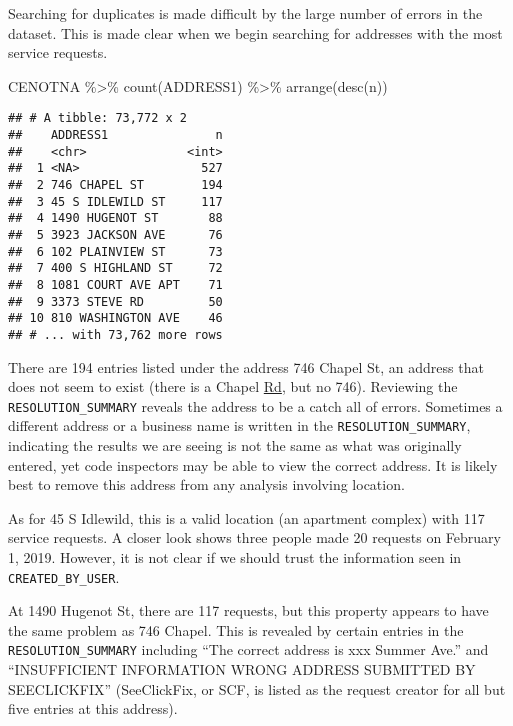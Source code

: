 \documentclass[
]{book}
\newenvironment{Shaded}{\begin{snugshade}}{\end{snugshade}}
\newcommand{\FunctionTok}[1]{\textcolor[rgb]{0.00,0.00,0.00}{#1}}
\newcommand{\NormalTok}[1]{#1}
\newcommand{\SpecialCharTok}[1]{\textcolor[rgb]{0.00,0.00,0.00}{#1}}
\begin{document}
Searching for duplicates is made difficult by the large number of errors in the dataset. This is made clear when we begin searching for addresses with the most service requests.

\begin{Shaded}
\begin{Highlighting}[]
\NormalTok{CENOTNA }\SpecialCharTok{\%\textgreater{}\%} \FunctionTok{count}\NormalTok{(ADDRESS1) }\SpecialCharTok{\%\textgreater{}\%} \FunctionTok{arrange}\NormalTok{(}\FunctionTok{desc}\NormalTok{(n))}
\end{Highlighting}
\end{Shaded}

\begin{verbatim}
## # A tibble: 73,772 x 2
##    ADDRESS1               n
##    <chr>              <int>
##  1 <NA>                 527
##  2 746 CHAPEL ST        194
##  3 45 S IDLEWILD ST     117
##  4 1490 HUGENOT ST       88
##  5 3923 JACKSON AVE      76
##  6 102 PLAINVIEW ST      73
##  7 400 S HIGHLAND ST     72
##  8 1081 COURT AVE APT    71
##  9 3373 STEVE RD         50
## 10 810 WASHINGTON AVE    46
## # ... with 73,762 more rows
\end{verbatim}

There are 194 entries listed under the address 746 Chapel St, an address that does not seem to exist (there is a Chapel \underline{Rd}, but no 746). Reviewing the \texttt{RESOLUTION\_SUMMARY} reveals the address to be a catch all of errors. Sometimes a different address or a business name is written in the \texttt{RESOLUTION\_SUMMARY}, indicating the results we are seeing is not the same as what was originally entered, yet code inspectors may be able to view the correct address. It is likely best to remove this address from any analysis involving location.

As for 45 S Idlewild, this is a valid location (an apartment complex) with 117 service requests. A closer look shows three people made 20 requests on February 1, 2019. However, it is not clear if we should trust the information seen in \texttt{CREATED\_BY\_USER}.

At 1490 Hugenot St, there are 117 requests, but this property appears to have the same problem as 746 Chapel. This is revealed by certain entries in the \texttt{RESOLUTION\_SUMMARY} including ``The correct address is xxx Summer Ave.'' and ``INSUFFICIENT INFORMATION WRONG ADDRESS SUBMITTED BY SEECLICKFIX'' (SeeClickFix, or SCF, is listed as the request creator for all but five entries at this address).
\end{document}
